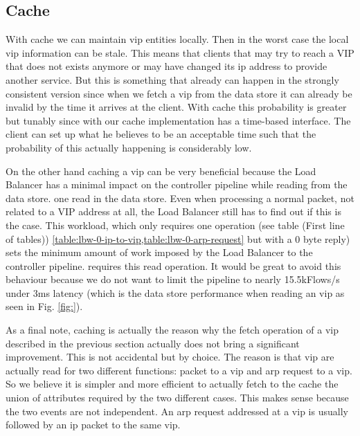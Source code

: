 \subsection{Cache}
With cache  we can maintain \gls{vip} entities locally. Then in the worst case the local \gls{vip} information can be stale.
This means that  clients that may try to reach a VIP that does not exists anymore or may have changed its \gls{ip}  address to provide another service. 
But this is something that already can happen in the strongly consistent version since when we fetch a \gls{vip} from the data store it can already be invalid by the time it arrives at the client. 
With cache this probability is greater but tunably  since with our cache implementation has a time-based interface. 
The client can set up what he believes to be an acceptable time such that the probability of this actually happening is considerably low. 


On the other hand caching a \gls{vip} can be very beneficial because the Load Balancer has a minimal impact on the controller pipeline while reading from the data store. 
one read in the data store. Even when processing a normal packet, not related to a VIP address at
all, the Load Balancer still has to find out if this is the case. This
workload, which only requires one operation (see table (First line of tables))
\ref{table:lbw-0-ip-to-vip,table:lbw-0-arp-request} but with  a 0 byte
reply) sets the minimum amount of work imposed by
the Load Balancer to the controller pipeline. 
requires this read operation. It would be great to avoid this
behaviour because we do not want to limit the pipeline to nearly 15.5kFlows/s
under 3ms latency (which is the data store performance when reading an
\gls{vip} as seen in Fig. \ref{fig:}). 




As a final note, caching is actually the reason why the fetch
operation of a \gls{vip} described in the previous section actually
does not bring a significant improvement. This is not accidental but
by choice. The reason is that \gls{vip} are actually read for two
different functions: packet to a vip and arp request to a vip. So we
believe it is simpler and more efficient to actually fetch to the
cache the union of attributes required by the two different
cases. This makes sense because the two events are not independent. An
\gls{arp} request addressed at a \gls{vip} is usually followed by an
\gls{ip} packet to the same \gls{vip}.  

